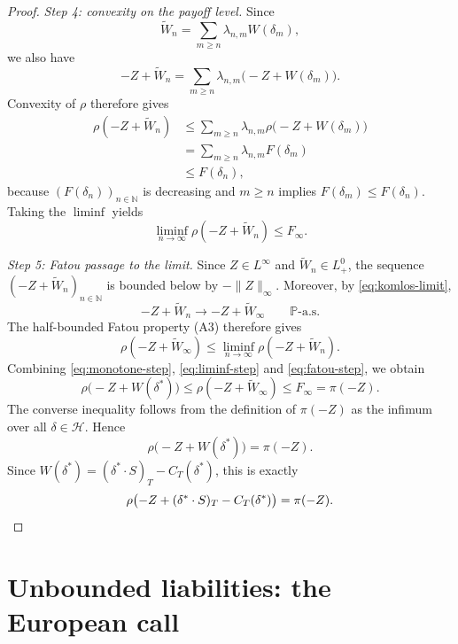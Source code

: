 \documentclass[11pt,a4paper]{report}
\numberwithin{equation}{chapter}
\theoremstyle{plain}
\theoremstyle{definition}
\newcommand{\PP}{\mathbb{P}}
\newcommand{\N}{\mathbb{N}}
\newcommand{\HH}{\mathcal{H}}
\begin{document}
\begin{proof}
    \emph{Step 4: convexity on the payoff level.}
    Since
    \[
        \widetilde W_n=\sum_{m\ge n}\lambda_{n,m}W(\delta_m),
    \]
    we also have
    \[
        -Z+\widetilde W_n=\sum_{m\ge n}\lambda_{n,m}\bigl(-Z+W(\delta_m)\bigr).
    \]
    Convexity of $\rho$ therefore gives
    \begin{equation}\label{eq:convexity-step}
        \begin{aligned}
            \rho(-Z+\widetilde W_n) & \le\sum_{m\ge n}\lambda_{n,m}\rho\bigl(-Z+W(\delta_m)\bigr) \\
                                    & =\sum_{m\ge n}\lambda_{n,m}F(\delta_m)                      \\
                                    & \le F(\delta_n),
        \end{aligned}
    \end{equation}
    because $(F(\delta_n))_{n\in\N}$ is decreasing and $m\ge n$ implies $F(\delta_m)\le F(\delta_n)$. Taking the $\liminf$ yields
    \begin{equation}\label{eq:liminf-step}
        \liminf_{n\to\infty}\rho(-Z+\widetilde W_n)\le F_\infty.
    \end{equation}

    \emph{Step 5: Fatou passage to the limit.}
    Since $Z\in L^\infty$ and $\widetilde W_n\in L^0_+$, the sequence $(-Z+\widetilde W_n)_{n\in\N}$ is bounded below by $-\|Z\|_\infty$. Moreover, by \eqref{eq:komlos-limit},
    \[
        -Z+\widetilde W_n\to-Z+\widetilde W_\infty\qquad\PP\text{-a.s.}
    \]
    The half-bounded Fatou property (A3) therefore gives
    \begin{equation}\label{eq:fatou-step}
        \rho(-Z+\widetilde W_\infty)\le\liminf_{n\to\infty}\rho(-Z+\widetilde W_n).
    \end{equation}
    Combining \eqref{eq:monotone-step}, \eqref{eq:liminf-step} and \eqref{eq:fatou-step}, we obtain
    \[
        \rho\bigl(-Z+W(\delta^*)\bigr)\le\rho(-Z+\widetilde W_\infty)\le F_\infty=\pi(-Z).
    \]
    The converse inequality follows from the definition of $\pi(-Z)$ as the infimum over all $\delta\in\HH$. Hence
    \[
        \rho\bigl(-Z+W(\delta^*)\bigr)=\pi(-Z).
    \]
    Since $W(\delta^*)=(\delta^*\cdot S)_T-C_T(\delta^*)$, this is exactly
    \[
        \rho\bigl(-Z+(\delta^*\cdot S)_T-C_T(\delta^*)\bigr)=\pi(-Z).\qedhere
    \]
\end{proof}

\section{Unbounded liabilities: the European call}\label{sec:call}
\end{document}

